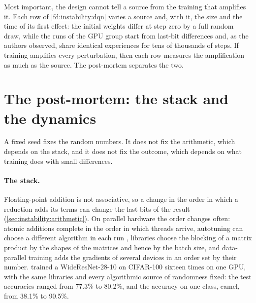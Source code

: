 \begin{refsection}
Most important, the design cannot tell a source from the training that amplifies it. Each row of \cref{fd:instability:dqn} varies a source and, with it, the size and the time of its first effect: the initial weights differ at step zero by a full random draw, while the runs of the GPU group start from last-bit differences and, as the authors observed, share identical experiences for tens of thousands of steps. If training amplifies every perturbation, then each row measures the amplification as much as the source. The post-mortem separates the two.

\section{The post-mortem: the stack and the dynamics}\label{sec:instability:postmortem}

A fixed seed fixes the random numbers. It does not fix the arithmetic, which depends on the stack, and it does not fix the outcome, which depends on what training does with small differences.

\paragraph{The stack.} Floating-point addition is not associative, so a change in the order in which a reduction adds its terms can change the last bits of the result (\cref{sec:instability:arithmetic}). On parallel hardware the order changes often: atomic additions complete in the order in which threads arrive, autotuning can choose a different algorithm in each run \parencite{PhamEtAl2020}, libraries choose the blocking of a matrix product by the shapes of the matrices and hence by the batch size, and data-parallel training adds the gradients of several devices in an order set by their number. \Textcite{PhamEtAl2020} trained a WideResNet-28-10 on CIFAR-100 sixteen times on one GPU, with the same libraries and every algorithmic source of randomness fixed: the test accuracies ranged from 77.3\% to 80.2\%, and the accuracy on one class, camel, from 38.1\% to 90.5\%.


\end{refsection}
